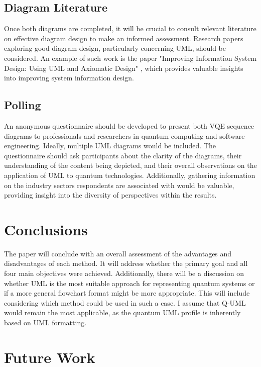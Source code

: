 \documentclass{article}
\begin{document}
\subsection{Diagram Literature}

Once both diagrams are completed, it will be crucial to consult relevant literature on effective diagram design to make an informed assessment. Research papers exploring good diagram design, particularly concerning UML, should be considered. An example of such work is the paper "Improving Information System Design: Using UML and Axiomatic Design" \cite{CAVIQUE2022103569}, which provides valuable insights into improving system information design.

\subsection{Polling}

An anonymous questionnaire should be developed to present both VQE sequence diagrams to professionals and researchers in quantum computing and software engineering. Ideally, multiple UML diagrams would be included. The questionnaire should ask participants about the clarity of the diagrams, their understanding of the content being depicted, and their overall observations on the application of UML to quantum technologies. Additionally, gathering information on the industry sectors respondents are associated with would be valuable, providing insight into the diversity of perspectives within the results.

\section{Conclusions}

The paper will conclude with an overall assessment of the advantages and disadvantages of each method. It will address whether the primary goal and all four main objectives were achieved. Additionally, there will be a discussion on whether UML is the most suitable approach for representing quantum systems or if a more general flowchart format might be more appropriate. This will include considering which method could be used in such a case. I assume that Q-UML would remain the most applicable, as the quantum UML profile is inherently based on UML formatting.

\section{Future Work}
\end{document}
